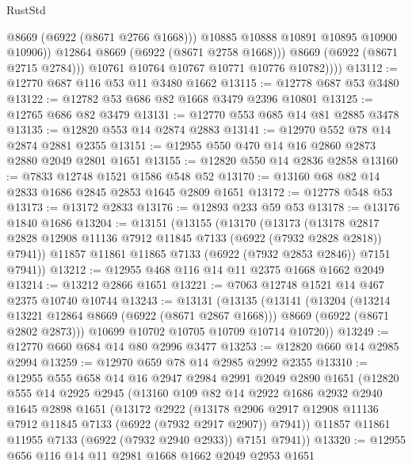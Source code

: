 \begin{lexlean}{RustStd}
\begin{coremodule}
                      @8669
                      (@6922 (@8671 @2766 @1668)))
                    @10885
                    @10888
                    @10891
                    @10895
                    @10900
                    @10906))
                @12864
                @8669
                (@6922 (@8671 @2758 @1668)))
              @8669
              (@6922 (@8671 @2715 @2784)))
            @10761
            @10764
            @10767
            @10771
            @10776
            @10782))))
@13112 := @12770 @687 @116 @53 @11 @3480 @1662
@13115 := @12778 @687 @53 @3480
@13122 := @12782 @53 @686 @82 @1668 @3479 @2396 @10801
@13125 := @12765 @686 @82 @3479
@13131 := @12770 @553 @685 @14 @81 @2885 @3478
@13135 := @12820 @553 @14 @2874 @2883
@13141 := @12970 @552 @78 @14 @2874 @2881 @2355
@13151 := @12955 @550 @470 @14 @16 @2860 @2873 @2880 @2049 @2801 @1651
@13155 := @12820 @550 @14 @2836 @2858
@13160 := @7833 @12748 @1521 @1586 @548 @52
@13170 := @13160 @68 @82 @14 @2833 @1686 @2845 @2853 @1645 @2809 @1651
@13172 := @12778 @548 @53
@13173 := @13172 @2833
@13176 := @12893 @233 @59 @53
@13178 := @13176 @1840 @1686
@13204 := @13151
    (@13155
      (@13170
        (@13173
          (@13178 @2817 @2828 @12908 @11136 @7912 @11845 @7133 (@6922 (@7932 @2828 @2818)) @7941))
        @11857
        @11861
        @11865
        @7133
        (@6922 (@7932 @2853 @2846))
        @7151
        @7941))
@13212 := @12955 @468 @116 @14 @11 @2375 @1668 @1662 @2049
@13214 := @13212 @2866 @1651
@13221 := @7063 @12748 @1521 @14 @467 @2375 @10740 @10744
@13243 := @13131
    (@13135
      (@13141
        (@13204
          (@13214 @13221 @12864 @8669 (@6922 (@8671 @2867 @1668)))
          @8669
          (@6922 (@8671 @2802 @2873)))
        @10699
        @10702
        @10705
        @10709
        @10714
        @10720))
@13249 := @12770 @660 @684 @14 @80 @2996 @3477
@13253 := @12820 @660 @14 @2985 @2994
@13259 := @12970 @659 @78 @14 @2985 @2992 @2355
@13310 := @12955
    @555
    @658
    @14
    @16
    @2947
    @2984
    @2991
    @2049
    @2890
    @1651
    (@12820
      @555
      @14
      @2925
      @2945
      (@13160
        @109
        @82
        @14
        @2922
        @1686
        @2932
        @2940
        @1645
        @2898
        @1651
        (@13172
          @2922
          (@13178 @2906 @2917 @12908 @11136 @7912 @11845 @7133 (@6922 (@7932 @2917 @2907)) @7941))
        @11857
        @11861
        @11955
        @7133
        (@6922 (@7932 @2940 @2933))
        @7151
        @7941))
@13320 := @12955 @656 @116 @14 @11 @2981 @1668 @1662 @2049 @2953 @1651

\end{coremodule}
\end{lexlean}
